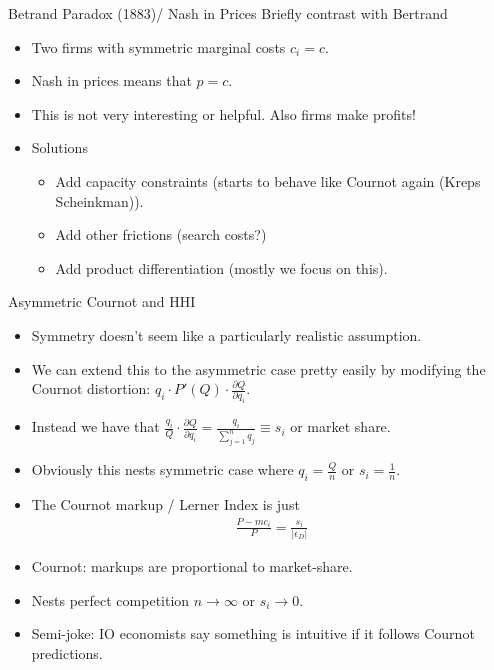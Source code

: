 \documentclass[xcolor=pdftex,dvipsnames,table,mathserif]{beamer}
\begin{document}
\begin{frame}{Betrand Paradox (1883)/ Nash in Prices}
Briefly contrast with Bertrand
\begin{itemize}
\item Two firms with symmetric marginal costs $c_i=c$.
\item Nash in prices means that $p = c$.
\item This is not very interesting or helpful.  Also firms make profits!
\item Solutions

\begin{itemize}
\item Add capacity constraints (starts to behave like Cournot again (Kreps Scheinkman)).
\item Add other frictions (search costs?)
\item Add product differentiation (mostly we focus on this).
\end{itemize}
\end{itemize}
\end{frame}


\begin{frame}{Asymmetric Cournot and HHI}
\begin{itemize}
\item Symmetry doesn't seem like a particularly realistic assumption.
\item We can extend this to the asymmetric case pretty easily by modifying the \alert{Cournot distortion}: $q_i \cdot P'(Q) \cdot \frac{\partial Q}{\partial q_i}$.
\item Instead we have that $\frac{q_i}{Q} \cdot \frac{\partial Q}{\partial q_i} = \frac{q_i}{\sum_{j=1}^n q_j} \equiv s_i$ or \alert{market share}.
\item Obviously this nests symmetric case where $q_i = \frac{Q}{n}$ or $s_i = \frac{1}{n}$.
\item The Cournot markup / Lerner Index is just
\begin{eqnarray*}
\frac{P-mc_i}{P} = \frac{s_i}{|\epsilon_D|}
\end{eqnarray*}
\item Cournot: markups are proportional to market-share.
\item Nests perfect competition $n \rightarrow \infty$ or $s_i \rightarrow 0$.
\item Semi-joke: IO economists say something is \alert{intuitive} if it follows Cournot predictions.
\end{itemize}
\end{frame}
\end{document}
